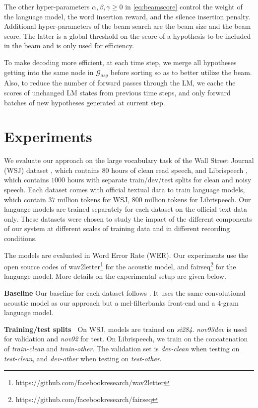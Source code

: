 \documentclass[a4paper]{article}
\begin{document}
The other hyper-parameters $\alpha,\beta,\gamma\geq 0$ in \eqref{eq:beamscore} control the weight of the language model, the word insertion reward, and the silence insertion penalty. Additional hyper-parameters of the beam search are the beam size and the beam score. The latter is a global threshold on the score of a hypothesis to be included in the beam and is only used for efficiency.

To make decoding more efficient, at each time step, we merge all hypotheses getting into the same node in $\mathcal{G}_{asg}$ before sorting so as to better utilize the beam. Also, to reduce the number of forward passes through the LM, we cache the scores of unchanged LM states from previous time steps, and only forward batches of new hypotheses generated at current step.



\section{Experiments}
\label{sec:experiments}
We evaluate our approach on the large vocabulary task of the Wall Street Journal (WSJ) dataset \cite{wsj}, which contains 80 hours of clean read speech, and Librispeech \cite{librispeech}, which contains $1000$ hours with separate train/dev/test splits for clean and noisy speech. Each dataset comes with official textual data to train language models, which contain $37$ million tokens for WSJ, $800$ million tokens for Librispeech. Our language models are trained separately for each dataset on the official text data only.
These datasets were chosen to study the impact of the different components of our system at different scales of training data and in different recording conditions. 

The models are evaluated in Word Error Rate (WER). Our experiments use the open source codes of wav2letter\footnote{https://github.com/facebookresearch/wav2letter} for the acoustic model, and fairseq\footnote{https://github.com/facebookresearch/fairseq} for the language model. More details on the experimental setup are given below. 

{\bf Baseline} Our baseline for each dataset follows \cite{wav2letter2}. It uses the same convolutional acoustic model as our approach but a mel-filterbanks front-end and a $4$-gram language model.

{\bf Training/test splits~} On WSJ, models are trained on \textit{si284}. \textit{nov93dev} is used for validation and \textit{nov92} for test. On Librispeech, we train on the concatenation of \textit{train-clean} and {\it train-other}. The validation set is {\it dev-clean} when testing on {\it test-clean}, and {\it dev-other} when testing on {\it test-other}.
\end{document}
